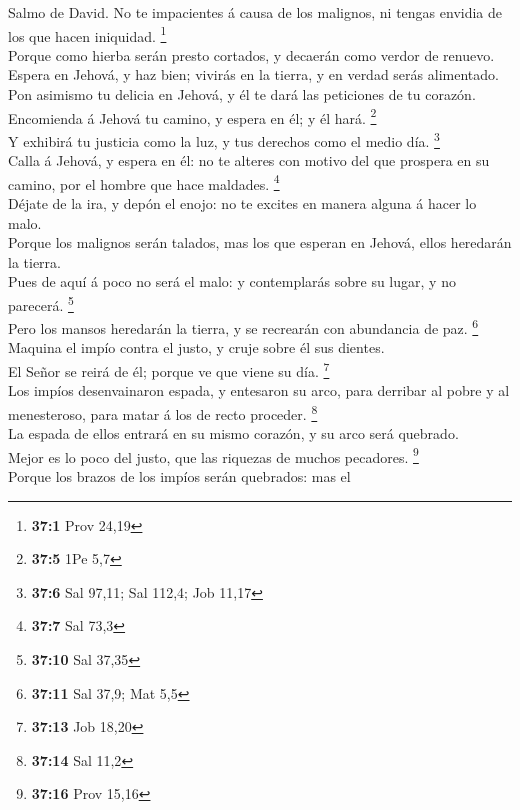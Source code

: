  Salmo de David. No te impacientes á causa de los malignos,
ni tengas envidia de los que hacen iniquidad. \footnote{\textbf{37:1}
  Prov 24,19}\\
 Porque como hierba serán presto cortados, y decaerán como
verdor de renuevo.\\
 Espera en Jehová, y haz bien; vivirás en la tierra, y en
verdad serás alimentado.\\
 Pon asimismo tu delicia en Jehová, y él te dará las
peticiones de tu corazón.\\
 Encomienda á Jehová tu camino, y espera en él; y él hará.
\footnote{\textbf{37:5} 1Pe 5,7}\\
 Y exhibirá tu justicia como la luz, y tus derechos como el
medio día. \footnote{\textbf{37:6} Sal 97,11; Sal 112,4; Job 11,17}\\
 Calla á Jehová, y espera en él: no te alteres con motivo
del que prospera en su camino, por el hombre que hace maldades.
\footnote{\textbf{37:7} Sal 73,3}\\
 Déjate de la ira, y depón el enojo: no te excites en manera
alguna á hacer lo malo.\\
 Porque los malignos serán talados, mas los que esperan en
Jehová, ellos heredarán la tierra.\\
 Pues de aquí á poco no será el malo: y contemplarás sobre
su lugar, y no parecerá. \footnote{\textbf{37:10} Sal 37,35}\\
 Pero los mansos heredarán la tierra, y se recrearán con
abundancia de paz. \footnote{\textbf{37:11} Sal 37,9; Mat 5,5}\\
 Maquina el impío contra el justo, y cruje sobre él sus
dientes.\\
 El Señor se reirá de él; porque ve que viene su día.
\footnote{\textbf{37:13} Job 18,20}\\
 Los impíos desenvainaron espada, y entesaron su arco, para
derribar al pobre y al menesteroso, para matar á los de recto proceder.
\footnote{\textbf{37:14} Sal 11,2}\\
 La espada de ellos entrará en su mismo corazón, y su arco
será quebrado.\\
 Mejor es lo poco del justo, que las riquezas de muchos
pecadores. \footnote{\textbf{37:16} Prov 15,16}\\
 Porque los brazos de los impíos serán quebrados: mas el
